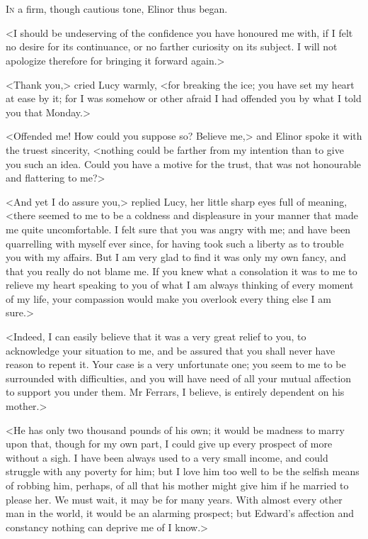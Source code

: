 \chapter[Chapter \thechapter]{}
\lettrine[lraise=0.3]{I}{n} a firm, though cautious tone, Elinor thus began.

\zz
<I should be undeserving of the confidence you have honoured me with, if I felt no desire for its continuance, or no farther curiosity on its subject. I will not apologize therefore for bringing it forward again.>

<Thank you,> cried Lucy warmly, <for breaking the ice; you have set my heart at ease by it; for I was somehow or other afraid I had offended you by what I told you that Monday.>

<Offended me! How could you suppose so? Believe me,> and Elinor spoke it with the truest sincerity, <nothing could be farther from my intention than to give you such an idea. Could you have a motive for the trust, that was not honourable and flattering to me?>

<And yet I do assure you,> replied Lucy, her little sharp eyes full of meaning, <there seemed to me to be a coldness and displeasure in your manner that made me quite uncomfortable. I felt sure that you was angry with me; and have been quarrelling with myself ever since, for having took such a liberty as to trouble you with my affairs. But I am very glad to find it was only my own fancy, and that you really do not blame me. If you knew what a consolation it was to me to relieve my heart speaking to you of what I am always thinking of every moment of my life, your compassion would make you overlook every thing else I am sure.>

<Indeed, I can easily believe that it was a very great relief to you, to acknowledge your situation to me, and be assured that you shall never have reason to repent it. Your case is a very unfortunate one; you seem to me to be surrounded with difficulties, and you will have need of all your mutual affection to support you under them. Mr Ferrars, I believe, is entirely dependent on his mother.>

<He has only two thousand pounds of his own; it would be madness to marry upon that, though for my own part, I could give up every prospect of more without a sigh. I have been always used to a very small income, and could struggle with any poverty for him; but I love him too well to be the selfish means of robbing him, perhaps, of all that his mother might give him if he married to please her. We must wait, it may be for many years. With almost every other man in the world, it would be an alarming prospect; but Edward's affection and constancy nothing can deprive me of I know.>

